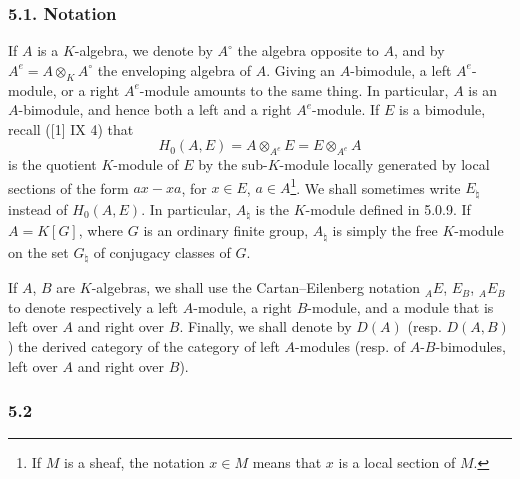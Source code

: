 \subsubsection*{5.1. Notation}

If $A$ is a $K$-algebra, we denote by $A^\circ$ the algebra opposite to $A$, and by $A^e=A\otimes_KA^\circ$ the enveloping algebra of $A$. Giving an $A$-bimodule, a left $A^e$-module, or a right $A^e$-module amounts to the same thing. In particular, $A$ is an $A$-bimodule, and hence both a left and a right $A^e$-module. If $E$ is a bimodule, recall ([1] IX 4) that
\[
H_0(A,E)=A\otimes_{A^e}E=E\otimes_{A^e}A
\]
is the quotient $K$-module of $E$ by the sub-$K$-module locally generated by local sections of the form $ax-xa$, for $x\in E$, $a\in A$\footnote{If $M$ is a sheaf, the notation $x\in M$ means that $x$ is a local section of $M$.}. We shall sometimes write $E_\natural$ instead of $H_0(A,E)$. In particular, $A_\natural$ is the $K$-module defined in 5.0.9. If $A=K[G]$, where $G$ is an ordinary finite group, $A_\natural$ is simply the free $K$-module on the set $G_\natural$ of conjugacy classes of $G$.

If $A$, $B$ are $K$-algebras, we shall use the Cartan--Eilenberg notation ${}_AE$, $E_B$, ${}_AE_B$ to denote respectively a left $A$-module, a right $B$-module, and a module that is left over $A$ and right over $B$. Finally, we shall denote by $D(A)$ (resp. $D(A,B)$) the derived category of the category of left $A$-modules (resp. of $A$-$B$-bimodules, left over $A$ and right over $B$).

\subsubsection*{5.2}

